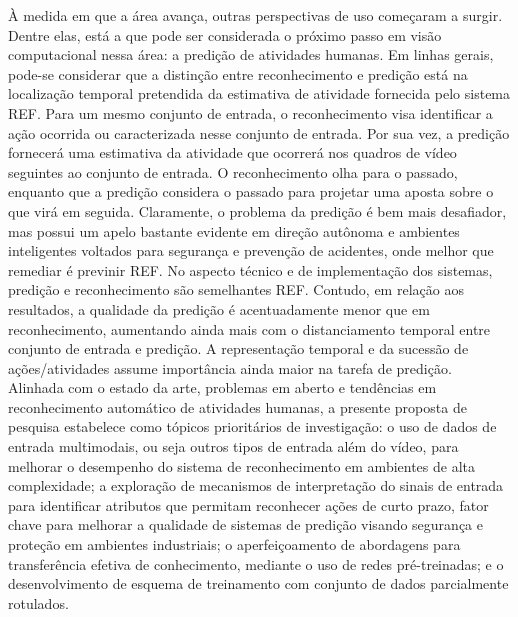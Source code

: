 
À medida em que a área avança, outras perspectivas de uso começaram a surgir. Dentre elas, está a que pode ser considerada o próximo passo em visão computacional nessa área: a predição de atividades humanas. Em linhas gerais, pode-se considerar que a distinção entre reconhecimento e predição está na localização temporal pretendida da estimativa de atividade fornecida pelo sistema REF. Para um mesmo conjunto de entrada, o reconhecimento visa identificar a ação ocorrida ou caracterizada nesse conjunto de entrada. Por sua vez, a predição fornecerá uma estimativa da atividade que ocorrerá nos quadros de vídeo seguintes ao conjunto de entrada. O reconhecimento olha para o passado, enquanto que a predição considera o passado para projetar uma aposta sobre o que virá em seguida. Claramente, o problema da predição é bem mais desafiador, mas possui um apelo bastante evidente em direção autônoma e ambientes inteligentes voltados para segurança e prevenção de acidentes, onde melhor que remediar é previnir REF. No aspecto técnico e de implementação dos sistemas, predição e reconhecimento são semelhantes REF. Contudo, em relação aos resultados, a qualidade da predição é acentuadamente menor que em reconhecimento, aumentando ainda mais com o distanciamento temporal entre conjunto de entrada e predição. A representação temporal e da sucessão de ações/atividades assume importância ainda maior na tarefa de predição.
Alinhada com o estado da arte, problemas em aberto e tendências em reconhecimento automático de atividades humanas, a presente proposta de pesquisa estabelece como tópicos prioritários de investigação: o uso de dados de entrada  multimodais, ou seja outros tipos de entrada além do vídeo, para melhorar o desempenho do sistema de reconhecimento em ambientes de alta complexidade; a exploração de mecanismos de interpretação do sinais de entrada para identificar atributos que permitam reconhecer ações de curto prazo, fator chave para melhorar a qualidade de sistemas de predição visando segurança e proteção em ambientes industriais; o aperfeiçoamento de abordagens para transferência efetiva de conhecimento, mediante o uso de redes pré-treinadas; e o desenvolvimento de esquema de treinamento com conjunto de dados parcialmente rotulados.

